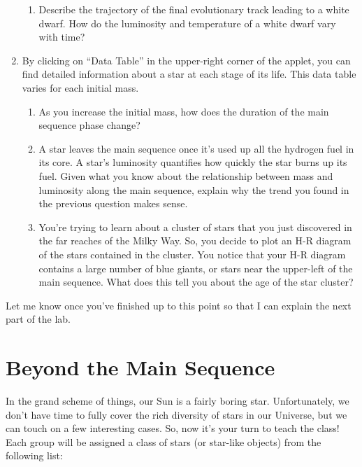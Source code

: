 \documentclass[11pt]{article}
\begin{document}
\begin{enumerate}
\begin{enumerate}
        \item Describe the trajectory of the final evolutionary track leading to a white dwarf. How do the luminosity and temperature of a white dwarf vary with time? 
    \end{enumerate}
    
    \item By clicking on ``Data Table'' in the upper-right corner of the applet, you can find detailed information about a star at each stage of its life. This data table varies for each initial mass. 
    \begin{enumerate}
        \item As you increase the initial mass, how does the duration of the main sequence phase change?
        
        \item A star leaves the main sequence once it's used up all the hydrogen fuel in its core. A star's luminosity quantifies how quickly the star burns up its fuel. Given what you know about the relationship between mass and luminosity along the main sequence, explain why the trend you found in the previous question makes sense.
        
        \item You're trying to learn about a cluster of stars that you just discovered in the far reaches of the Milky Way. So, you decide to plot an H-R diagram of the stars contained in the cluster. You notice that your H-R diagram contains a large number of blue giants, or stars near the upper-left of the main sequence. What does this tell you about the age of the star cluster?
        
    \end{enumerate}
\end{enumerate}

\medskip \noindent
Let me know once you've finished up to this point so that I can explain the next part of the lab.

\section{Beyond the Main Sequence}
In the grand scheme of things, our Sun is a fairly boring star. Unfortunately, we don't have time to fully cover the rich diversity of stars in our Universe, but we can touch on a few interesting cases. So, now it's your turn to teach the class! Each group will be assigned a class of stars (or star-like objects) from the following list:
\end{document}

